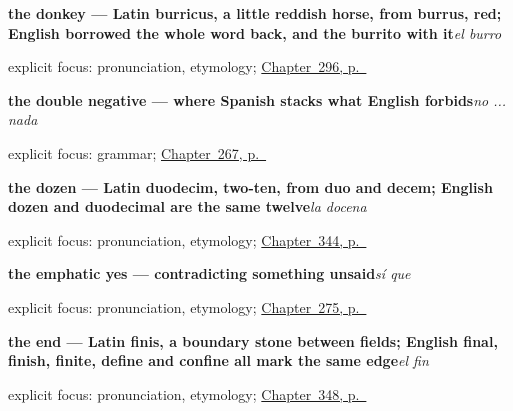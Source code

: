 \noindent\begin{minipage}[t]{\linewidth}
\raggedright
\textbf{the donkey — Latin burricus, a little reddish horse, from burrus, red; English borrowed the whole word back, and the burrito with it}\enspace\emph{el burro}\par
\footnotesize explicit focus: pronunciation, etymology; \hyperref[ch:animales]{Chapter~296, p.~\pageref*{ch:animales}}
\end{minipage}\par\smallskip

\noindent\begin{minipage}[t]{\linewidth}
\raggedright
\textbf{the double negative — where Spanish stacks what English forbids}\enspace\emph{no ... nada}\par
\footnotesize explicit focus: grammar; \hyperref[ch:es-negate-and-ask]{Chapter~267, p.~\pageref*{ch:es-negate-and-ask}}
\end{minipage}\par\smallskip

\noindent\begin{minipage}[t]{\linewidth}
\raggedright
\textbf{the dozen — Latin duodecim, two-ten, from duo and decem; English dozen and duodecimal are the same twelve}\enspace\emph{la docena}\par
\footnotesize explicit focus: pronunciation, etymology; \hyperref[ch:cero-y-mitad]{Chapter~344, p.~\pageref*{ch:cero-y-mitad}}
\end{minipage}\par\smallskip

\noindent\begin{minipage}[t]{\linewidth}
\raggedright
\textbf{the emphatic yes — contradicting something unsaid}\enspace\emph{sí que}\par
\footnotesize explicit focus: pronunciation, etymology; \hyperref[ch:matices]{Chapter~275, p.~\pageref*{ch:matices}}
\end{minipage}\par\smallskip

\noindent\begin{minipage}[t]{\linewidth}
\raggedright
\textbf{the end — Latin finis, a boundary stone between fields; English final, finish, finite, define and confine all mark the same edge}\enspace\emph{el fin}\par
\footnotesize explicit focus: pronunciation, etymology; \hyperref[ch:el-principio-y-el-fin]{Chapter~348, p.~\pageref*{ch:el-principio-y-el-fin}}
\end{minipage}\par\smallskip

